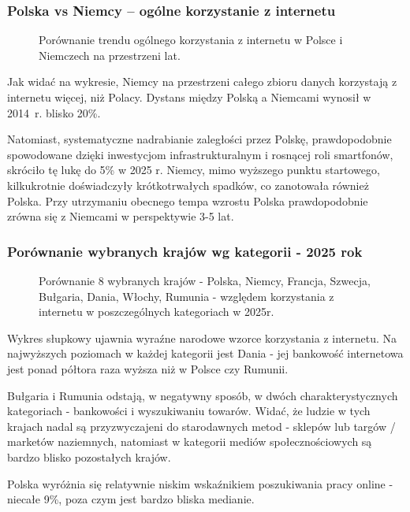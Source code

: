 \documentclass[12pt]{article}
\begin{document}
\subsubsection{Polska vs Niemcy – ogólne korzystanie z internetu}

\begin{figure}[H]
    
    \caption{Porównanie trendu ogólnego korzystania z internetu w Polsce i Niemczech na przestrzeni lat.}
\end{figure}

Jak widać na wykresie, Niemcy na przestrzeni całego zbioru danych korzystają z internetu więcej, niż Polacy.
Dystans między Polską a Niemcami wynosił w 2014~r. blisko 20\%.

Natomiast, systematyczne nadrabianie zaległości przez Polskę, prawdopodobnie spowodowane dzięki inwestycjom infrastrukturalnym 
i rosnącej roli smartfonów, skróciło tę lukę do 5\% w 2025 r. Niemcy, mimo wyższego punktu startowego, kilkukrotnie doświadczyły 
krótkotrwałych spadków, co zanotowała również Polska.
Przy utrzymaniu obecnego tempa wzrostu Polska prawdopodobnie zrówna się z Niemcami w perspektywie 3-5 lat.




\subsubsection{Porównanie wybranych krajów wg kategorii - 2025 rok}

\begin{figure}[H]
    
    \caption{Porównanie 8 wybranych krajów - Polska, Niemcy, Francja, Szwecja, Bułgaria,
   Dania, Włochy, Rumunia - względem korzystania z internetu w poszczególnych kategoriach w 2025r.}
\end{figure}
  
Wykres słupkowy ujawnia wyraźne narodowe wzorce korzystania z internetu. Na najwyższych poziomach w każdej kategorii jest Dania - jej bankowość
internetowa jest ponad półtora raza wyższa niż w Polsce czy Rumunii.

Bułgaria i Rumunia odstają, w negatywny sposób, w dwóch charakterystycznych kategoriach - bankowości i wyszukiwaniu towarów. 
Widać, że ludzie w tych krajach nadal są przyzwyczajeni do starodawnych metod - sklepów lub targów / marketów naziemnych, natomiast 
w kategorii mediów społecznościowych są bardzo blisko pozostałych krajów.

Polska wyróżnia się relatywnie niskim wskaźnikiem poszukiwania pracy online - niecałe 9\%, poza czym jest 
bardzo bliska medianie.
\end{document}
